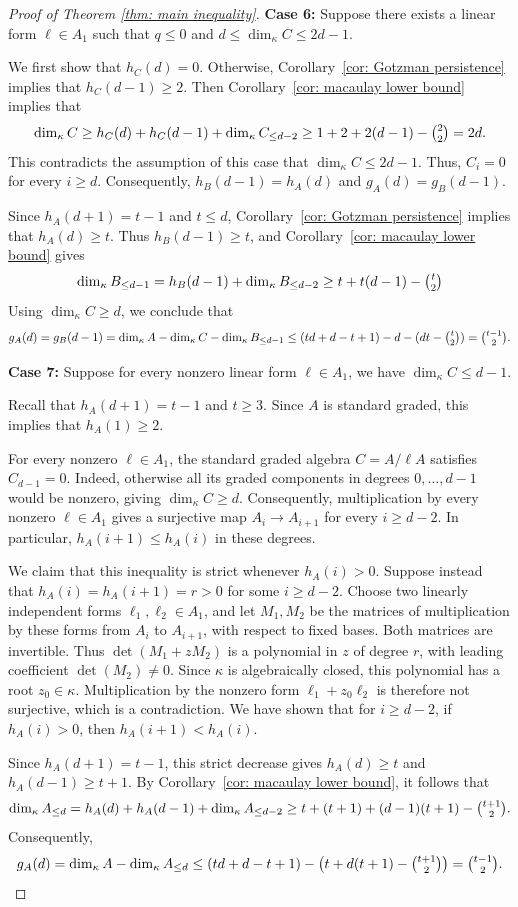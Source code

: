 \documentclass[11pt]{amsart}
\theoremstyle{definition}
\newcommand{\dimk}{\dim_{\kappa}}
\begin{document}
\begin{proof}[Proof of Theorem \ref{thm: main inequality}]
\noindent\textbf{Case 6:} Suppose there exists a linear form $\ell\in A_1$ such that $q\leq 0$ and $d\leq \dimk C\leq 2d-1$.

We first show that $h_C(d)=0$. Otherwise, Corollary~\ref{cor: Gotzman persistence} implies that $h_C(d-1)\geq 2$. 
Then Corollary~\ref{cor: macaulay lower bound} implies that
\[
\dimk C
\geq h_C(d) +h_C(d-1) +\dimk C_{\leq d-2}
\geq 1+ 2 + 2(d-1) -\tbinom{2}{2}
=2d.
\]
This contradicts the assumption of this case that $\dimk C\leq 2d-1$. Thus, $C_i=0$ for every $i\geq d$. Consequently, $h_B(d-1)=h_A(d)$ and $g_A(d)=g_B(d-1)$.

Since $h_A(d+1)=t-1$ and $t\le d$, Corollary~\ref{cor: Gotzman persistence} implies that $h_A(d)\ge t$. Thus $h_B(d-1)\ge t$, and Corollary~\ref{cor: macaulay lower bound} gives
\[
\dimk B_{\leq d-1} 
= h_B(d-1) +\dimk B_{\leq d-2}
\geq t +t(d-1) -\tbinom{t}{2}
\]
Using $\dimk C\geq d$, we conclude that
\[
g_A(d)
=g_B(d-1)
=\dimk A-\dimk C-\dimk B_{\le d-1}
\leq (td+d-t+1)-d-(dt-\tbinom{t}{2})
=\tbinom{t-1}{2}.
\]



\noindent\textbf{Case 7:} Suppose for every nonzero linear form
$\ell\in A_1$, we have $\dimk C\leq d-1$.

Recall that $h_A(d+1)=t-1$ and $t\geq 3$. Since $A$ is
standard graded, this implies that $h_A(1)\geq 2$.

For every nonzero $\ell\in A_1$, the standard graded algebra
$C=A/\ell A$ satisfies $C_{d-1}=0$. Indeed, otherwise all its
graded components in degrees $0,\ldots,d-1$ would be nonzero,
giving $\dimk C\geq d$. Consequently, multiplication by every
nonzero $\ell\in A_1$ gives a surjective map
$A_i\longrightarrow A_{i+1}$ for every $i\geq d-2$.
In particular, $h_A(i+1)\leq h_A(i)$ in these degrees.

We claim that this inequality is strict whenever $h_A(i)>0$.
Suppose instead that $h_A(i)=h_A(i+1)=r>0$ for some
$i\geq d-2$. Choose two linearly independent forms
$\ell_1,\ell_2\in A_1$, and let $M_1,M_2$ be the matrices of
multiplication by these forms from $A_i$ to $A_{i+1}$, with
respect to fixed bases. Both matrices are invertible.
Thus $\det(M_1+zM_2)$ is a polynomial in $z$ of degree $r$,
with leading coefficient $\det(M_2)\neq 0$. Since $\kappa$
is algebraically closed, this polynomial has a root $z_0\in\kappa$.
Multiplication by the nonzero form $\ell_1+z_0\ell_2$ is
therefore not surjective, which is a contradiction.
We have shown that for $i\geq d-2$, if $h_A(i)>0$, then $h_A(i+1)<h_A(i)$.

Since $h_A(d+1)=t-1$, this strict decrease gives
$h_A(d)\geq t$ and $h_A(d-1)\geq t+1$.
By Corollary~\ref{cor: macaulay lower bound}, it follows that
\[
\dimk A_{\leq d}
=h_A(d)+h_A(d-1) +\dimk A_{\le d-2}
\geq t + (t+1) + (d-1)(t+1) -\tbinom{t+1}{2}.
\]
Consequently,
\[
g_A(d)
=\dimk A-\dimk A_{\leq d}
\leq (td+d-t+1)-\left(t+d(t+1)-\tbinom{t+1}{2}\right)
=\tbinom{t-1}{2}. \qedhere
\]
\end{proof}









\end{document}
